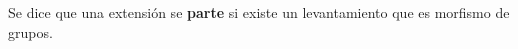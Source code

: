 %

\begin{definition}
	Se dice que una extensión se \textbf{parte} si existe un levantamiento que
	es morfismo de grupos.
\end{definition}

%
%	

